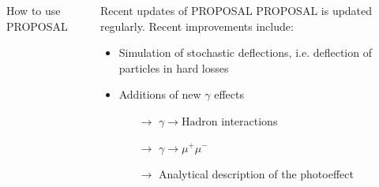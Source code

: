 \documentclass[t]{beamer}
\newlength{\itemseparation}
\begin{document}
\begin{columns}[onlytextwidth]
\begin{column}{0.6\textwidth}
\begin{block}{How to use PROPOSAL}
      \end{block}%
    \end{column}%
    \begin{column}{0.4\textwidth}%
      \begin{block}{Recent updates of PROPOSAL}%
        PROPOSAL is updated regularly. Recent improvements include:
        \begin{itemize}
          \setlength\itemsep{\itemseparation}
          \item Simulation of stochastic deflections, i.e. deflection of particles in hard losses
          \item Additions of new $\gamma$ effects
          \begin{itemize}
            \setlength\itemsep{\itemseparation}
            \item[$\rightarrow$] $\gamma \rightarrow \text{Hadron}$ interactions
            \item[$\rightarrow$] $\gamma \rightarrow \mu^+ \mu^-$
            \item[$\rightarrow$] Analytical description of the photoeffect
          \end{itemize}
        \end{itemize}
      \end{block}%
    \end{column}%
  \end{columns}%
\end{document}
